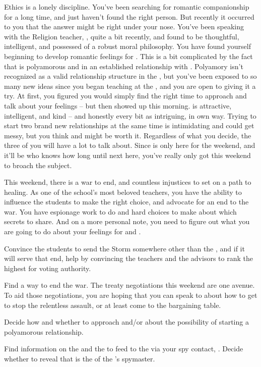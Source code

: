 \documentclass[char]{GL2020}
\begin{document}
Ethics is a lonely discipline. You've been searching for romantic companionship for a long time, and just haven't found the right person. But recently it occurred to you that the answer might be right under your nose. You've been speaking with the Religion teacher, \cBeetle{\full}, quite a bit recently, and found \cBeetle{\them} to be thoughtful, intelligent, and possessed of a robust moral philosophy. You have found yourself beginning to develop romantic feelings for \cBeetle{\them}. This is a bit complicated by the fact that \cBeetle{} is polyamorous and in an established relationship with \cJuniorStatesman{\full}. Polyamory isn't recognized as a valid relationship structure in the \pTech{}, but you've been exposed to so many new ideas since you began teaching at the \pSchool{}, and you are open to giving it a try. At first, you figured you would simply find the right time to approach \cBeetle{} and talk about your feelings -- but then \cJuniorStatesman{} showed up this morning. \cJuniorStatesman{} is attractive, intelligent, and kind -- and honestly every bit as intriguing, in \cJuniorStatesman{\their} own way. Trying to start two brand new relationships at the same time is intimidating and could get messy, but you think \cJuniorStatesman{} and \cBeetle{} might be worth it. Regardless of what you decide, the three of you will have a lot to talk about. Since \cJuniorStatesman{} is only here for the weekend, and it'll be who knows how long until \cJuniorStatesman{\theyare} next here, you've really only got this weekend to broach the subject.

This weekend, there is a war to end, and countless injustices to set on a path to healing. As one of the school's most beloved teachers, you have the ability to influence the students to make the right choice, and advocate for an end to the war. You have espionage work to do and hard choices to make about which secrets to share. And on a more personal note, you need to figure out what you are going to do about your feelings for \cJuniorStatesman{} and \cBeetle{}.

\begin{itemz}
	\item Convince the students to send the Storm somewhere other than the \pShip{}, and if it will serve that end, help \cAmbition{} by convincing the \pShip{} teachers and the \pTech{} advisors to rank \cAmbition{\them} the highest for voting authority.
\item Find a way to end the war. The treaty negotiations this weekend are one avenue. To aid those negotiations, you are hoping that you can speak to \cWarlordDaughter{} about how to get \cLoud{} to stop the relentless \pShip{} assault, or at least come to the bargaining table.
	\item Decide how and whether to approach \cBeetle{} and/or \cJuniorStatesman{} about the possibility of starting a polyamorous relationship.
	\item Find information on the \pFarm{} and the \pTech{} to feed to the \pShip{} via your spy contact, \cBunker{}. Decide whether to reveal that \cHistory{} is the \cQueen{\Majesty} of the \pFarm{}'s spymaster.
\end{itemz}
\end{document}
